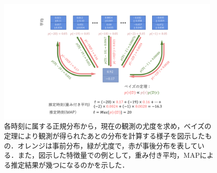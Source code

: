 \begin{figure}[htbp]
  \centering
    \includegraphics[width=11cm,keepaspectratio]{fig/update_flow.pdf}
  \caption{各時刻に属する正規分布から，現在の観測の尤度を求め，ベイズの定理により観測が得られたあとの分布を計算する様子を図示したもの．オレンジは事前分布，緑が尤度で，赤が事後分布を表している．また，図示した特徴量での例として，重み付き平均，MAPによる推定結果が幾つになるのかを示した．}
  \label{fig:update_flow}
\end{figure}
